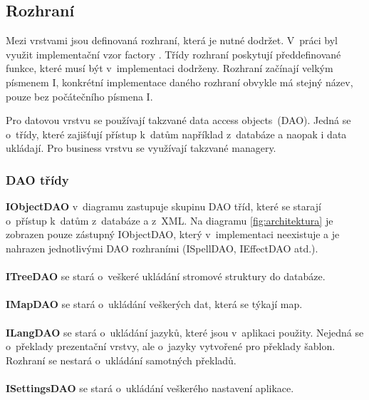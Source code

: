 \documentclass[thesis=B,czech]{resources/FITthesis}[2012/06/26]
\begin{document}
\subsection{Rozhraní}
Mezi vrstvami jsou definovaná rozhraní, která je nutné dodržet. V~práci byl využit implementační vzor factory \cite{factory}. Třídy rozhraní poskytují předdefinované funkce, které musí být v~implementaci dodrženy. Rozhraní začínají velkým písmenem I, konkrétní implementace daného rozhraní obvykle má stejný název, pouze bez počátečního písmena I.\par

Pro datovou vrstvu se používají takzvané \clqq data access objects\crqq  ~(DAO). Jedná se o~třídy, které zajišťují přístup k~datům například z~databáze a naopak i data ukládají. Pro business vrstvu se využívají takzvané \clqq managery\crqq .\par


\subsubsection*{DAO třídy}
\noindent\textbf{IObjectDAO} v~diagramu zastupuje skupinu DAO tříd, které se starají o~přístup k~datům z~databáze a z~XML. Na diagramu \ref{fig:architektura} je zobrazen pouze zástupný IObjectDAO, který v~implementaci neexistuje a je nahrazen jednotlivými DAO rozhraními (ISpellDAO, IEffectDAO atd.).\\
\\
\textbf{ITreeDAO} se stará o~veškeré ukládání stromové struktury do databáze. \\
\\
\textbf{IMapDAO} se stará o~ukládání veškerých dat, která se týkají map. \\
\\
\textbf{ILangDAO} se stará o~ukládání jazyků, které jsou v~aplikaci použity. Nejedná se o~překlady prezentační vrstvy, ale o~jazyky vytvořené pro překlady šablon. Rozhraní se nestará o~ukládání samotných překladů.\\
\\
\textbf{ISettingsDAO} se stará o~ukládání veškerého nastavení aplikace. 
\end{document}
